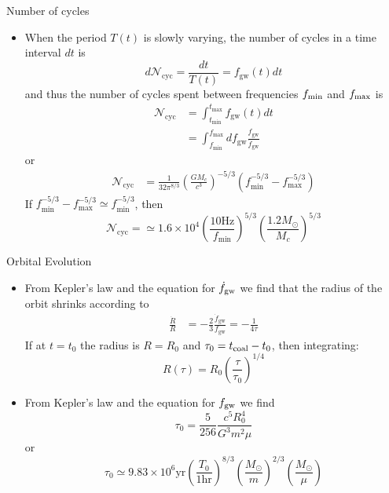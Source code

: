 \documentclass[size=11pt,style=paintings]{powerdot}
\begin{document}
\begin{slide}{Number of cycles}
 \begin{itemize}
 \item When the period $T(t)$ is slowly varying, the number of cycles in a time interval $dt$ is
$$
d  \mathcal{N}_{\mathrm{cyc}}=\frac{d t}{  T(t)}=f_{\mathrm{gw}}(t) d t
$$
and thus the number of cycles spent between frequencies $f_{\rm min}$ and $f_{\rm max}$ is
\vspace{-0.2cm}
$$
\begin{aligned} \mathcal{N}_{\mathrm{cyc}} &=\int_{t_{\min }}^{t_{\max }} f_{\mathrm{gw}}(t) d t \\ &=\int_{f_{\min }}^{f_{\max }} d f_{\mathrm{gw}} \frac{f_{\mathrm{gw}}}{\dot f_{\mathrm{gw}}} \end{aligned}
$$
or
\vspace{-0.15cm}
$$
\begin{aligned} \mathcal{N}_{\mathrm{cyc}} &=\frac{1}{32 \pi^{8 / 3}}\left(\frac{G M_{c}}{c^{3}}\right)^{-5 / 3}\left(f_{\min }^{-5 / 3}-f_{\max }^{-5 / 3}\right)  \end{aligned}
$$
If $
f_{\min }^{-5 / 3}-f_{\max }^{-5 / 3} \simeq f_{\min }^{-5 / 3}
$, then
$$
 \boxed{\mathcal{N}_{\mathrm{cyc}} = \simeq 1.6 \times 10^{4}\left(\frac{10 \mathrm{Hz}}{f_{\min }}\right)^{5
/ 3}\left(\frac{1.2 M_{\odot}}{M_{c}}\right)^{5 / 3} }
$$
 \end{itemize}
 \end{slide}


\begin{slide}{Orbital Evolution}
 \begin{itemize}

 \item From Kepler's law and the equation for $\dot f_{\rm gw}$ we find that the radius of the orbit shrinks according to 
 $$
\begin{aligned} \frac{\dot{R}}{R} &=-\frac{2}{3} \frac{\dot{f}_{\mathrm{gw}}}{f_{\mathrm{gw}}} =-\frac{1}{4 \tau} \end{aligned}
$$
If at $t=t_0$ the radius is $R=R_0$ and $\tau_0 = t_{\rm coal}-t_0$, then integrating:
$$
\boxed{ R(\tau) =R_{0}\left(\frac{\tau}{\tau_{0}}\right)^{1 / 4}  }
$$
 \vspace{-0.3cm}
\item From Kepler's law and the equation for $f_{\rm gw}$ we find 
$$
\tau_{0}=\frac{5}{256} \frac{c^{5} R_{0}^{4}}{G^{3} m^{2} \mu}
$$
 \vspace{-0.3cm}
or
$$
\boxed{\tau_{0} \simeq 9.83 \times 10^{6} \mathrm{yr}\left(\frac{T_{0}}{1 \mathrm{hr}}\right)^{8 / 3}\left(\frac{M_{\odot}}{m}\right)^{2 / 3}\left(\frac{M_{\odot}}{\mu}\right)}
$$

 \end{itemize}
 \end{slide}
\end{document}
